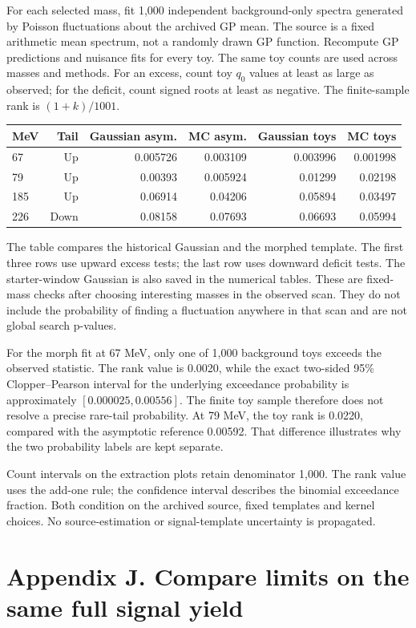 \documentclass[11pt]{article}
\begin{document}
For each selected mass, fit 1,000 independent background-only spectra generated by Poisson fluctuations about the archived GP mean. The source is a fixed arithmetic mean spectrum, not a randomly drawn GP function. Recompute GP predictions and nuisance fits for every toy. The same toy counts are used across masses and methods. For an excess, count toy $q_0$ values at least as large as observed; for the deficit, count signed roots at least as negative. The finite-sample rank is $(1+k)/1001$.
\begin{center}\small\begin{tabular}{lrrrrr}\toprule
MeV & Tail & Gaussian asym. & MC asym. & Gaussian toys & MC toys\\\midrule
67 & Up & 0.005726 & 0.003109 & 0.003996 & 0.001998\\
79 & Up & 0.00393 & 0.005924 & 0.01299 & 0.02198\\
185 & Up & 0.06914 & 0.04206 & 0.05894 & 0.03497\\
226 & Down & 0.08158 & 0.07693 & 0.06693 & 0.05994\\
\bottomrule\end{tabular}\end{center}
The table compares the historical Gaussian and the morphed template. The first three rows use upward excess tests; the last row uses downward deficit tests. The starter-window Gaussian is also saved in the numerical tables. These are fixed-mass checks after choosing interesting masses in the observed scan. They do not include the probability of finding a fluctuation anywhere in that scan and are not global search p-values.

For the morph fit at 67 MeV, only one of 1,000 background toys exceeds the observed statistic. The rank value is 0.0020, while the exact two-sided 95\% Clopper--Pearson interval for the underlying exceedance probability is approximately $[0.000025,0.00556]$. The finite toy sample therefore does not resolve a precise rare-tail probability. At 79 MeV, the toy rank is 0.0220, compared with the asymptotic reference 0.00592. That difference illustrates why the two probability labels are kept separate.

Count intervals on the extraction plots retain denominator 1,000. The rank value uses the add-one rule; the confidence interval describes the binomial exceedance fraction. Both condition on the archived source, fixed templates and kernel choices. No source-estimation or signal-template uncertainty is propagated.
\clearpage\section*{Appendix J. Compare limits on the same full signal yield}
\end{document}
